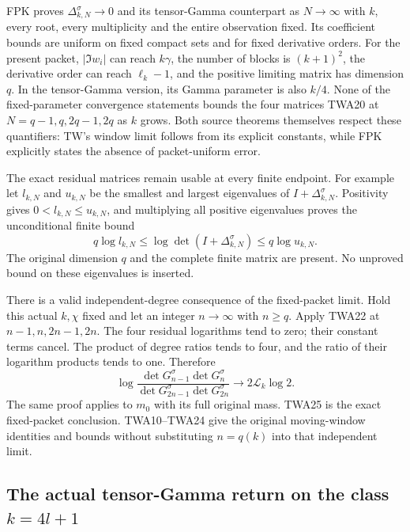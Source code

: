 FPK proves $\Delta_{k,N}^\sigma\to0$ and its tensor-Gamma
counterpart as $N\to\infty$ with $k$, every root, every multiplicity
and the entire observation fixed. Its coefficient bounds are
uniform on fixed compact sets and for fixed derivative orders.
For the present packet, $|\Im w_i|$ can reach $k\gamma$, the
number of blocks is $(k+1)^2$, the derivative order can reach
$\ell_k-1$, and the positive limiting matrix has dimension $q$.
In the tensor-Gamma version, its Gamma parameter is also $k/4$.
None of the fixed-parameter convergence statements bounds the
four matrices TWA20 at $N=q-1,q,2q-1,2q$ as $k$ grows.
Both source theorems themselves respect these quantifiers: TW's
window limit follows from its explicit constants, while FPK
explicitly states the absence of packet-uniform error.

The exact residual matrices remain usable at every finite endpoint.
For example let $l_{k,N}$ and $u_{k,N}$ be the smallest and largest
eigenvalues of $I+\Delta_{k,N}^\sigma$. Positivity gives
$0<l_{k,N}\le u_{k,N}$, and multiplying all positive eigenvalues
proves the unconditional finite bound
\[
q\log l_{k,N}\le\log\det(I+\Delta_{k,N}^\sigma)
                         \le q\log u_{k,N}.
\]
The original dimension $q$ and the complete finite matrix are
present. No unproved bound on these eigenvalues is inserted.

There is a valid independent-degree consequence of the fixed-packet
limit. Hold this actual $k,\chi$ fixed and let an integer $n\to\infty$
with $n\ge q$. Apply TWA22 at $n-1,n,2n-1,2n$. The four residual
logarithms tend to zero; their constant terms cancel. The product
of degree ratios tends to four, and the ratio of their logarithm
products tends to one. Therefore
\[
\log\frac{\det G_{n-1}^\sigma\det G_n^\sigma}
               {\det G_{2n-1}^\sigma\det G_{2n}^\sigma}
\longrightarrow2\mathcal L_k\log2.
\tag{TWA25}
\]
The same proof applies to $m_0$ with its full original mass.
TWA25 is the exact fixed-packet conclusion. TWA10--TWA24 give
the original moving-window identities and bounds without
substituting $n=q(k)$ into that independent limit.


\subsection{The actual tensor-Gamma return on the class $k=4l+1$}


